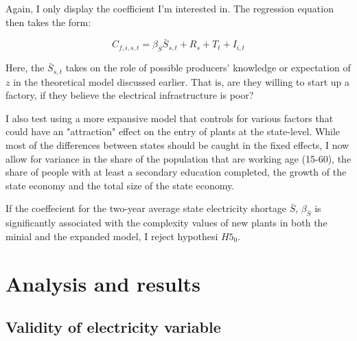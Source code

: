 \documentclass[11pt]{article}
\begin{document}
Again, I only display the coefficient I'm interested in. The regression equation then takes the form:

\begin{equation}
\label{eqn:entry}
C_{f,i,s,t} = \beta_{\bar{S}} \bar{S}_{s,t} + R_{s} + T_{t} + I_{i,t} 
\end{equation}

Here, the $\bar{S}_{s,t}$ takes on the role of possible producers' knowledge or expectation of $z$ in the theoretical model discussed earlier. That is, are they willing to start up a factory, if they believe the electrical infrastructure is poor?

I also test using a more expansive model that controls for various factors that could have an "attraction" effect on the entry of plants at the state-level. While most of the differences between states should be caught in the fixed effects, I now allow for variance in the share of the population that are working age (15-60), the share of people with at least a secondary education completed, the growth of the state economy and the total size of the state economy. 

If the coeffecient for the two-year average state electricity shortage $\bar{S}$, $\beta_{\bar{S}}$ is significantly associated with the complexity values of new plants in both the minial and the expanded model, I reject hypothesi $H5_0$.


\newpage

\section{Analysis and results}%
\label{sec:analysis_and_results}

\subsection{Validity of electricity variable}%
\label{sub:validity_of_electricity_variable}
\end{document}
